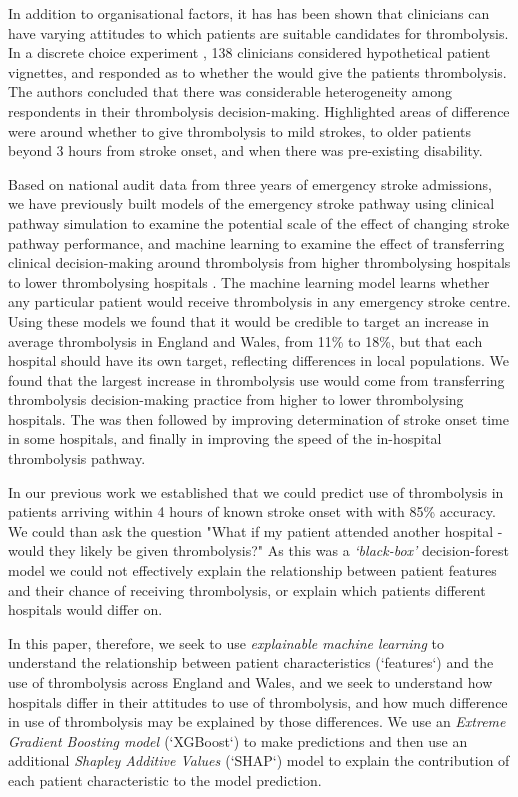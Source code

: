 In addition to organisational factors, it has has been shown that clinicians can have varying attitudes to which patients are suitable candidates for thrombolysis. In a discrete choice experiment \cite{de_brun_factors_2018}, 138 clinicians considered hypothetical patient vignettes, and responded as to whether the would give the patients thrombolysis. The authors concluded that there was considerable heterogeneity among respondents in their thrombolysis decision-making. Highlighted areas of difference were around whether to give thrombolysis to mild strokes, to older patients beyond 3 hours from stroke onset, and when there was pre-existing disability.

Based on national audit data from three years of emergency stroke admissions, we have previously built models of the emergency stroke pathway using clinical pathway simulation to examine the potential scale of the effect of changing stroke pathway performance, and machine learning to examine the effect of transferring clinical decision-making around thrombolysis from higher thrombolysing hospitals to lower thrombolysing hospitals \cite{allen_using_2022, allen_use_2022}. The machine learning model learns whether any particular patient would receive thrombolysis in any emergency stroke centre. Using these models we found that it would be credible to target an increase in average thrombolysis in England and Wales, from 11\% to 18\%, but that each hospital should have its own target, reflecting differences in local populations. We found that the largest increase in thrombolysis use would come from transferring thrombolysis decision-making practice from higher to lower thrombolysing hospitals. The was then followed by improving determination of stroke onset time in some hospitals, and finally in improving the speed of the in-hospital thrombolysis pathway.


In our previous work we established that we could predict use of thrombolysis in patients arriving within 4 hours of known stroke onset with with 85\% accuracy. We could than ask the question "What if my patient attended another hospital - would they likely be given thrombolysis?" As this was a \emph{`black-box'} decision-forest model we could not effectively explain the relationship between patient features and their chance of receiving thrombolysis, or explain which patients different hospitals would differ on.


In this paper, therefore, we seek to use \emph{explainable machine learning} to understand the relationship between patient characteristics (`features`) and the use of thrombolysis across England and Wales, and we seek to understand how hospitals differ in their attitudes to use of thrombolysis, and how much difference in use of thrombolysis may be explained by those differences. We use an \emph{Extreme Gradient Boosting model \cite{chen_xgboost_2016}} (`XGBoost`) to make predictions and then use an additional \emph{Shapley Additive Values \cite{lundberg_unified_2017}} (`SHAP`) model to explain the contribution of each patient characteristic to the model prediction.